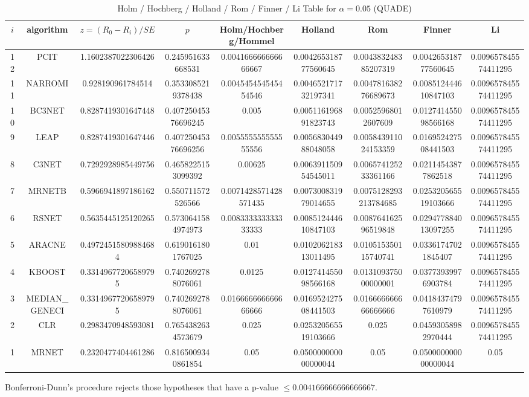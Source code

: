 \documentclass[a4paper,10pt]{article}
\begin{document}
\begin{landscape}
\begin{table}[!htp]
\centering\scriptsize
\caption{Holm / Hochberg / Holland / Rom / Finner / Li Table for $\alpha=0.05$ (QUADE)}
\begin{tabular}{ccccccccc}
$i$&algorithm&$z=(R_0 - R_i)/SE$&$p$&Holm/Hochberg/Hommel&Holland&Rom&Finner&Li\\
\hline
12&PCIT&1.1602387022306426&0.245951633668531&0.004166666666666667&0.004265318777560645&0.004383248385207319&0.004265318777560645&0.009657845574411295\\
11&NARROMI&0.928190961784514&0.3533085219378438&0.004545454545454546&0.004652171732197341&0.004781638276689673&0.008512444610847103&0.009657845574411295\\
10&BC3NET&0.8287419301647448&0.40725045376696245&0.005&0.005116196891823743&0.00525968012607609&0.012741455098566168&0.009657845574411295\\
9&LEAP&0.8287419301647446&0.40725045376696256&0.005555555555555556&0.005683044988048058&0.005843911024153359&0.016952427508441503&0.009657845574411295\\
8&C3NET&0.7292928985449756&0.4658225153099392&0.00625&0.006391150954545011&0.006574125233361166&0.02114543877862518&0.009657845574411295\\
7&MRNETB&0.5966941897186162&0.550711572526566&0.0071428571428571435&0.007300831979014655&0.0075128293213784685&0.025320565519103666&0.009657845574411295\\
6&RSNET&0.5635445125120265&0.5730641584974973&0.008333333333333333&0.008512444610847103&0.008764162596519848&0.029477884013097255&0.009657845574411295\\
5&ARACNE&0.49724515809884684&0.6190161801767025&0.01&0.010206218313011495&0.010515350115740741&0.03361747021845407&0.009657845574411295\\
4&KBOOST&0.33149677206589795&0.7402692788076061&0.0125&0.012741455098566168&0.013109375000000001&0.03773939976903784&0.009657845574411295\\
3&MEDIAN_GENECI&0.33149677206589795&0.7402692788076061&0.016666666666666666&0.016952427508441503&0.016666666666666666&0.04184374797610979&0.009657845574411295\\
2&CLR&0.2983470948593081&0.7654382634573679&0.025&0.025320565519103666&0.025&0.04593058982970444&0.009657845574411295\\
1&MRNET&0.2320477404461286&0.8165009340861854&0.05&0.050000000000000044&0.05&0.050000000000000044&0.05\\
\hline
\end{tabular}
\end{table}
Bonferroni-Dunn's procedure rejects those hypotheses that have a p-value $\le0.004166666666666667$.



\end{landscape}
\end{document}
